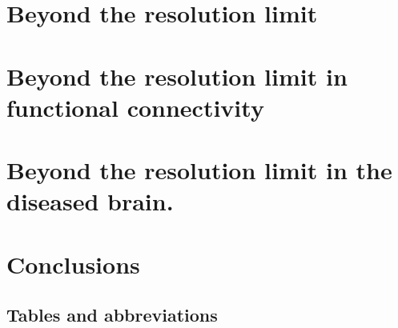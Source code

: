 \chapter{Beyond the resolution limit}\label{chap:beyondresolutionlimit}


\chapter{Beyond the resolution limit in functional connectivity}\label{chap:beyondresolutionlimitfunctionalconnectivity}


\chapter{Beyond the resolution limit in the diseased brain.}


\chapter{Conclusions}\label{chap:conclusions}







\begin{appendices}
\chapter{Tables and abbreviations}


\end{appendices}

%

